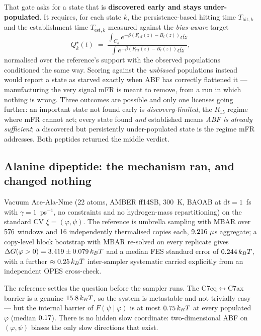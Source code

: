 That gate asks for a state that is \textbf{discovered early and stays under-populated}. It
requires, for each state $k$, the persistence-based hitting time $T_{\mathrm{hit},k}$ and
the establishment time $T_{\mathrm{est},k}$ measured against the \emph{bias-aware} target
\begin{equation}
  Q^\star_k(t) \;=\; \frac{\int_{C_k} e^{-\beta(F_{\mathrm{ref}}(z)-B_t(z))}\dd z}
                          {\int e^{-\beta(F_{\mathrm{ref}}(z)-B_t(z))}\dd z},
  \label{eq:biasaware}
\end{equation}
normalised over the reference's support with the observed populations conditioned the same
way. Scoring against the \emph{unbiased} populations instead would report a state as starved
exactly when ABF has correctly flattened it --- manufacturing the very signal mFR is meant to
remove, from a run in which nothing is wrong. Three outcomes are possible and only one
licenses going further: an important state not found early is \emph{discovery-limited}, the
$R_{15}$ regime where mFR cannot act; every state found \emph{and} established means
\emph{ABF is already sufficient}; a discovered but persistently under-populated state is the
regime mFR addresses. Both peptides returned the middle verdict.

\subsection{Alanine dipeptide: the mechanism ran, and changed nothing}
\label{sec:ala}
Vacuum Ace-Ala-Nme (22 atoms, AMBER ff14SB, 300~K, BAOAB at $\mathrm{d}t=1$~fs with
$\gamma=1$~ps$^{-1}$, no constraints and no hydrogen-mass repartitioning) on the standard
CV $\xi=(\varphi,\psi)$. The reference is umbrella sampling with MBAR over
$576$ windows and 16 independently thermalised copies each, $9.216~\mu$s
aggregate; a copy-level block bootstrap with MBAR re-solved on every replicate gives
$\Delta G(\varphi>0) = 3.419 \pm 0.079\,k_BT$ and a median FES standard error of
$0.244\,k_BT$, with a further $\approx0.25\,k_BT$ inter-sampler systematic
carried explicitly from an independent OPES cross-check.

The reference settles the question before the sampler runs. The C7eq$\leftrightarrow$C7ax
barrier is a genuine $15.8\,k_BT$, so the system is metastable and not trivially
easy --- but the internal barrier of $F(\psi\mid\varphi)$ is at most
$0.75\,k_BT$ at every populated $\varphi$ (median $0.17$). There is
no hidden slow coordinate: two-dimensional ABF on $(\varphi,\psi)$ biases the only slow
directions that exist.


